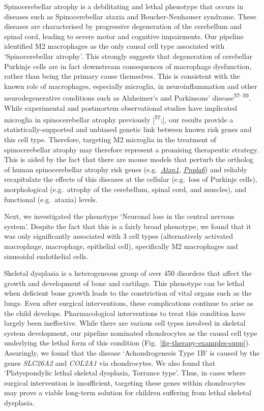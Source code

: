 \documentclass[
]{agujournal2019}
\begin{document}
Spinocerebellar atrophy is a debilitating and lethal phenotype that
occurs in diseases such as Spinocerebellar ataxia and Boucher-Nenhauser
syndrome. These diseases are characterised by progressive degeneration
of the cerebellum and spinal cord, leading to severe motor and cognitive
impairments. Our pipeline identified M2 macrophages as the only causal
cell type associated with `Spinocerebellar atrophy'. This strongly
suggests that degeneration of cerebellar Purkinje cells are in fact
downstream consequences of macrophage dysfunction, rather than being the
primary cause themselves. This is consistent with the known role of
macrophages, especially microglia, in neuroinflammation and other
neurodegenerative conditions such as Alzheimer's and Parkinsons'
disease\textsuperscript{57--59}. While experimental and postmortem
observational studies have implicated microglia in spinocerebellar
atrophy previously {[}\textsuperscript{57};{]}, our results provide a
statistically-supported and unbiased genetic link between known risk
genes and this cell type. Therefore, targeting M2 microglia in the
treatment of spinocerebellar atrophy may therefore represent a promising
therapeutic strategy. This is aided by the fact that there are mouse
models that perturb the ortholog of human spinocerebellar atrophy risk
genes
(e.g.~\href{https://www.informatics.jax.org/marker/MGI:104783}{\emph{Atxn1}},
\href{https://www.informatics.jax.org/marker/MGI:1354723}{\emph{Pnpla6}})
and reliably recapitulate the effects of this diseases at the cellular
(e.g.~loss of Purkinje cells), morphological (e.g.~atrophy of the
cerebellum, spinal cord, and muscles), and functional (e.g.~ataxia)
levels.

Next, we investigated the phenotype `Neuronal loss in the central
nervous system'. Despite the fact that this is a fairly broad phenotype,
we found that it was only significantly associated with 3 cell types
(alternatively activated macrophage, macrophage, epithelial cell),
specifically M2 macrophages and sinusoidal endothelial cells.

Skeletal dysplasia is a heterogeneous group of over 450 disorders that
affect the growth and development of bone and cartilage. This phenotype
can be lethal when deficient bone growth leads to the constriction of
vital organs such as the lungs. Even after surgical interventions, these
complications continue to arise as the child develops. Pharmacological
interventions to treat this condition have largely been ineffective.
While there are various cell types involved in skeletal system
development, our pipeline nominated chondrocytes as the causal cell type
underlying the lethal form of this condition
(Fig.~\ref{fig-therapy-examples-supp}). Assuringly, we found that the
disease `Achondrogenesis Type 1B' is caused by the genes \emph{SLC26A2}
and \emph{COL2A1} via chondrocytes. We also found that `Platyspondylic
lethal skeletal dysplasia, Torrance type'. Thus, in cases where surgical
intervention is insufficient, targeting these genes within chondrocytes
may prove a viable long-term solution for children suffering from lethal
skeletal dysplasia.
\end{document}
